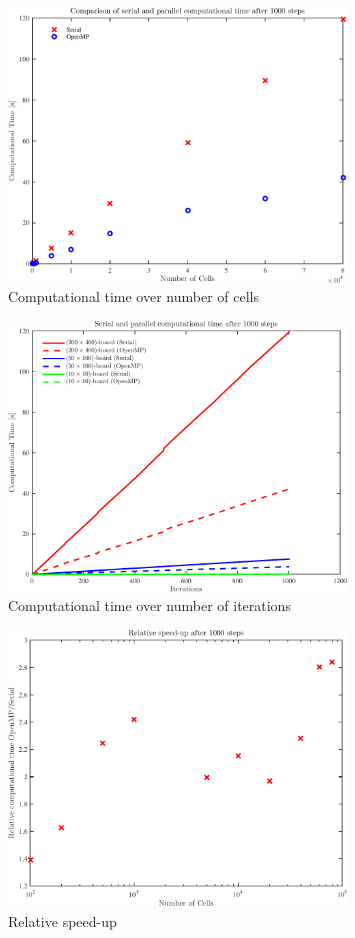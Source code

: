 \begin{figure}\centering
	\includegraphics[width=0.8\textwidth]{figures/SerialOpenMP_Cells.pdf}
	\caption{Computational time over number of cells}
	\label{fig:computationalTimeOverCells}
\end{figure}

\begin{figure}\centering
	\includegraphics[width=0.8\textwidth]{figures/SerialOpenMP_Iterations.pdf}
	\caption{Computational time over number of iterations}
	\label{fig:computationalTimeOverIterations}
\end{figure}

\begin{figure}\centering
	\includegraphics[width=0.8\textwidth]{figures/SerialOpenMP_Speedup.pdf}
	\caption{Relative speed-up}
	\label{fig:computationalTimeSpeedup}
\end{figure}
